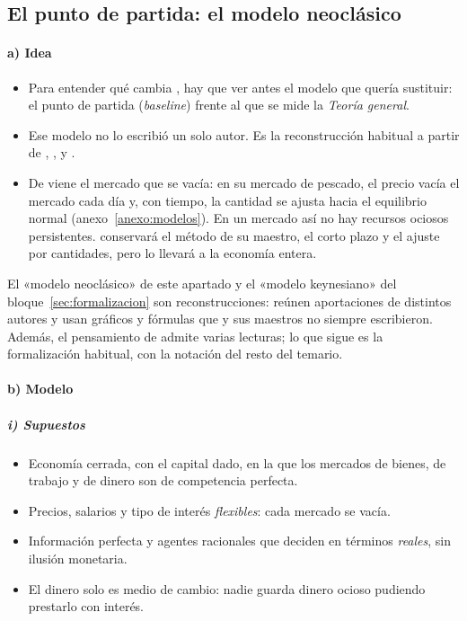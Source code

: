 \documentclass[11pt]{article}
\begin{document}
\subsection{El punto de partida: el modelo neoclásico}\label{sec:neoclasicos}

\paragraph{a) Idea}

\begin{itemize}
\item Para entender qué cambia , hay que ver antes el modelo que quería sustituir: el punto de partida (\emph{baseline}) frente al que se mide la \emph{Teoría general}.
\item Ese modelo no lo escribió un solo autor. Es la reconstrucción habitual a partir de , ,  y \nocite{Heijdra2017Foundations}.
\item De  viene el mercado que se vacía: en su mercado de pescado, el precio vacía el mercado cada día y, con tiempo, la cantidad se ajusta hacia el equilibrio normal\nocite{Marshall1890Principles}  (anexo~\ref{anexo:modelos}). En un mercado así no hay recursos ociosos persistentes.  conservará el método de su maestro, el corto plazo y el ajuste por cantidades, pero lo llevará a la economía entera.
\end{itemize}

\begin{anotaciones}
El «modelo neoclásico» de este apartado y el «modelo keynesiano» del bloque~\ref{sec:formalizacion} son reconstrucciones: reúnen aportaciones de distintos autores y usan gráficos y fórmulas que  y sus maestros no siempre escribieron. Además, el pensamiento de  admite varias lecturas; lo que sigue es la formalización habitual, con la notación del resto del temario.
\end{anotaciones}

\paragraph{b) Modelo}

\subparagraph{i) Supuestos}

\begin{itemize}
\item Economía cerrada, con el capital dado, en la que los mercados de bienes, de trabajo y de dinero son de competencia perfecta.
\item Precios, salarios y tipo de interés \emph{flexibles}: cada mercado se vacía.
\item Información perfecta y agentes racionales que deciden en términos \emph{reales}, sin ilusión monetaria.
\item El dinero solo es medio de cambio: nadie guarda dinero ocioso pudiendo prestarlo con interés.
\end{itemize}
\end{document}
